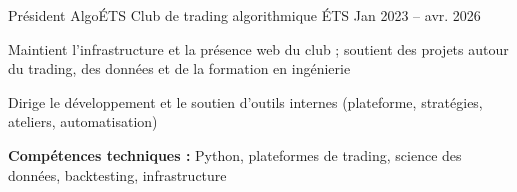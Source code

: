 
\begin{cventries}

\cventry
{Président} %
{AlgoÉTS} %
{Club de trading algorithmique ÉTS} %
{Jan 2023 -- avr. 2026} %
{
\begin{cvitems}
\item {Maintient l'infrastructure et la présence web du club ; soutient des projets autour du trading, des données et de la formation en ingénierie}
\item {Dirige le développement et le soutien d'outils internes (plateforme, stratégies, ateliers, automatisation)}
\item {\textbf{Compétences techniques :} Python, plateformes de trading, science des données, backtesting, infrastructure}
\end{cvitems}
}

\end{cventries}
